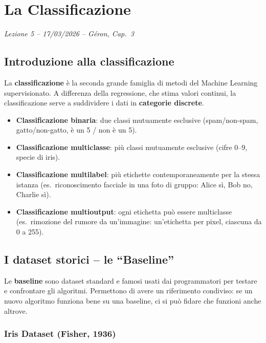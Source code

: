 \chapter{La Classificazione}
\begin{flushright}\small\textit{Lezione 5 -- 17/03/2026 -- G\'eron, Cap.\ 3}\end{flushright}

\section{Introduzione alla classificazione}
La \textbf{classificazione} è la seconda grande famiglia di metodi del Machine Learning supervisionato. A differenza della regressione, che stima valori continui, la classificazione serve a suddividere i dati in \textbf{categorie discrete}.

\begin{itemize}
    \item \textbf{Classificazione binaria}: due classi mutuamente esclusive (spam/non-spam, gatto/non-gatto, è un 5 / non è un 5).
    \item \textbf{Classificazione multiclasse}: più classi mutuamente esclusive (cifre 0--9, specie di iris).
    \item \textbf{Classificazione multilabel}: più etichette contemporaneamente per la stessa istanza (es.\ riconoscimento facciale in una foto di gruppo: Alice sì, Bob no, Charlie sì).
    \item \textbf{Classificazione multioutput}: ogni etichetta può essere multiclasse (es.\ rimozione del rumore da un'immagine: un'etichetta per pixel, ciascuna da 0 a 255).
\end{itemize}

\section{I dataset storici -- le ``Baseline''}

Le \textbf{baseline} sono dataset standard e famosi usati dai programmatori per testare e confrontare gli algoritmi. Permettono di avere un riferimento condiviso: se un nuovo algoritmo funziona bene su una baseline, ci si può fidare che funzioni anche altrove.

\subsection{Iris Dataset (Fisher, 1936)}

